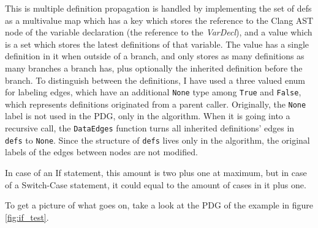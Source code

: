\documentclass[oneside,12pt,a4paper]{book}
\begin{document}
This is multiple definition propagation is handled by implementing the set of defs as a multivalue map which has a key which stores the reference to the Clang AST node of the variable declaration (the reference to the \textit{VarDecl}), and a value which is a set which stores the latest definitions of that variable. The value has a single definition in it when outside of a branch, and only stores as many definitions as many branches a branch has, plus optionally the inherited definition before the branch. To distinguish between the definitions, I have used a three valued enum for labeling edges, which have an additional \texttt{None} type among \texttt{True} and \texttt{False}, which represents definitions originated from a parent caller. Originally, the \texttt{None} label is not used in the PDG, only in the algorithm. When it is going into a recursive call, the \texttt{DataEdges} function turns all inherited definitions' edges in \texttt{defs} to \texttt{None}. Since the structure of \texttt{defs} lives only in the algorithm, the original labels of the edges between nodes are not modified. 

In case of an If statement, this amount is two plus one at maximum, but in case of a Switch-Case statement, it could equal to the amount of cases in it plus one. 

To get a picture of what goes on, take a look at the PDG of the example in figure \ref{fig:if_test}. 
\end{document}
